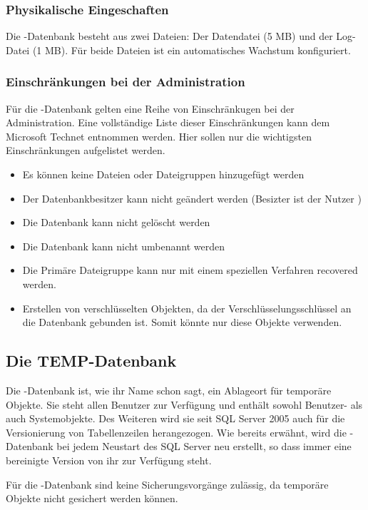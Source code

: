         \subsubsection{Physikalische Eingeschaften}
          Die -Datenbank besteht aus zwei Dateien: Der
          Datendatei  (5 MB) und der Log-Datei
           (1 MB). Für beide Dateien ist ein
          automatisches Wachstum konfiguriert.
        \subsubsection{Einschränkungen bei der Administration}
          Für die -Datenbank gelten eine Reihe von
          Einschränkugen bei der Administration. Eine vollständige Liste dieser
          Einschränkungen kann dem Microsoft Technet entnommen werden. Hier
          sollen nur die wichtigsten Einschränkungen aufgelistet werden.
          \begin{itemize}
            \item Es können keine Dateien oder Dateigruppen hinzugefügt werden
            \item Der Datenbankbesitzer kann nicht geändert werden (Besizter
            ist der Nutzer )
            \item Die Datenbank kann nicht gelöscht werden
            \item Die Datenbank kann nicht umbenannt werden
            \item Die Primäre Dateigruppe kann nur mit einem
            speziellen Verfahren recovered werden.
            \item Erstellen von verschlüsselten Objekten, da der
            Verschlüsselungsschlüssel an die Datenbank gebunden ist. Somit
            könnte nur  diese Objekte verwenden.
          \end{itemize}
          \begin{literaturinternet}
            \item \cite{ms186388}
          \end{literaturinternet}          
      \subsection{Die TEMP-Datenbank}
        Die -Datenbank ist, wie ihr Name schon sagt, ein
        Ablageort für temporäre Objekte. Sie steht allen Benutzer zur Verfügung
        und enthält sowohl Benutzer- als auch Systemobjekte. Des Weiteren wird
        sie seit SQL Server 2005 auch für die Versionierung von Tabellenzeilen
        herangezogen. Wie bereits erwähnt, wird die
        -Datenbank bei jedem Neustart des SQL Server neu
        erstellt, so dass immer eine bereinigte Version von ihr zur Verfügung
        steht.
        \begin{merke}
          Für die -Datenbank sind keine Sicherungsvorgänge
          zulässig, da temporäre Objekte nicht gesichert werden können.
        \end{merke}
